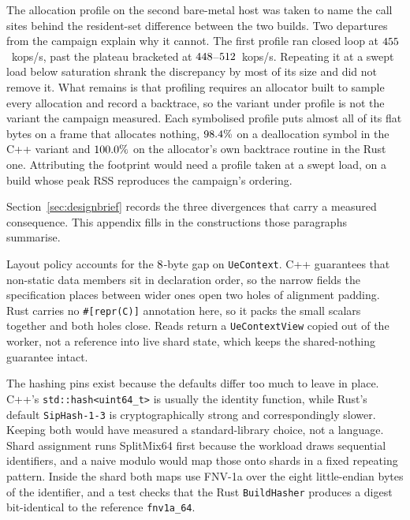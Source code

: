 \documentclass[english,oneside,a4paper,censored,csm,software-track-2020]{HYthesisML}
\begin{document}
\begin{appendices}
The allocation profile on the second bare-metal host was taken to name the call sites behind
the resident-set difference between the two builds. Two departures from the campaign
explain why it cannot. The first profile ran closed loop at $455$~kops/s, past the
plateau bracketed at $448$--$512$~kops/s. Repeating it at a swept load below saturation
shrank the discrepancy by most of its size and did not remove it. What remains is that
profiling requires an allocator built to sample every allocation and record a backtrace, so the
variant under profile is not the variant the campaign measured. Each symbolised profile puts almost all
of its flat bytes on a frame that allocates nothing, $98.4\%$ on a deallocation
symbol in the C++ variant and $100.0\%$ on the allocator's own backtrace routine in the
Rust one. Attributing the footprint would need a profile taken at a swept load, on a build
whose peak RSS reproduces the campaign's ordering.

Section~\ref{sec:designbrief} records the three divergences that carry a measured consequence.
This appendix fills in the constructions those paragraphs summarise.

Layout policy accounts for the $8$-byte gap on \texttt{UeContext}. C++ guarantees
that non-static data members sit in declaration order, so the narrow fields the specification
places between wider ones open two holes of alignment padding. Rust carries no
\texttt{\#[repr(C)]} annotation here, so it packs the small scalars together and both holes
close. Reads return a \texttt{UeContextView} copied out of the worker, not a reference into live
shard state, which keeps the shared-nothing guarantee intact.

The hashing pins exist because the defaults differ too much to leave in place. C++'s
\texttt{std::hash<uint64\_t>} is usually the identity function, while Rust's default
\texttt{SipHash-1-3} is cryptographically strong and correspondingly slower. Keeping both would have
measured a standard-library choice, not a language. Shard assignment runs SplitMix64 first
because the workload draws sequential identifiers, and a naive modulo would map those onto shards
in a fixed repeating pattern. Inside the shard both maps use FNV-1a over the eight little-endian
bytes of the identifier, and a test checks that the Rust \texttt{BuildHasher} produces a digest
bit-identical to the reference \texttt{fnv1a\_64}.


\end{appendices}
\end{document}
